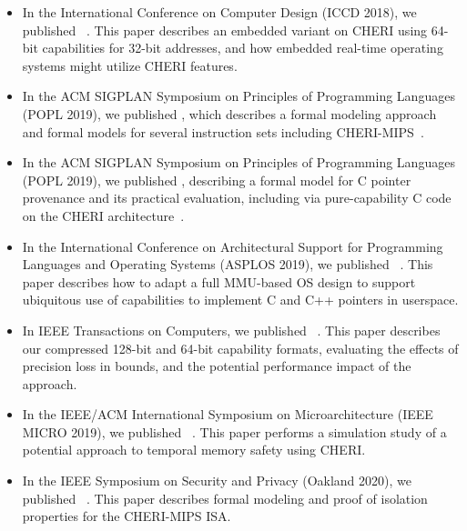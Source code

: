 \begin{itemize}
\item In the International Conference on Computer Design (ICCD 2018), we
  published ~\cite{xia:cherirtos}.
  This paper describes an embedded variant on CHERI using 64-bit capabilities
  for 32-bit addresses, and how embedded real-time operating systems might
  utilize CHERI features.

\item In the ACM SIGPLAN Symposium on Principles of Programming Languages
  (POPL 2019), we published , which describes
  a formal modeling approach and formal models
  for several instruction sets including CHERI-MIPS~\cite{sail-popl2019}.

\item In the ACM SIGPLAN Symposium on Principles of Programming Languages
  (POPL 2019), we published , describing a
  formal model for C pointer provenance and its
  practical evaluation, including via pure-capability C code on the CHERI
  architecture~\cite{cerberus-popl2019}.

\item In the International Conference on Architectural Support for
  Programming Languages and Operating Systems (ASPLOS 2019), we published
  ~\cite{davis2019:cheriabi}.
  This paper describes how to adapt a full MMU-based OS design to support
  ubiquitous use of capabilities to implement C and C++ pointers in userspace.

\item In IEEE Transactions on Computers, we published ~\cite{Woodruff2019}.
  This paper describes our compressed 128-bit and 64-bit capability formats,
  evaluating the effects of precision loss in bounds, and the potential
  performance impact of the approach.

\item In the IEEE/ACM International Symposium on Microarchitecture (IEEE
  MICRO 2019), we published ~\cite{Xia_CHERIvokeCharacterisingPointer_2019}.
  This paper performs a simulation study of a potential approach to temporal
  memory safety using CHERI.

\item In the IEEE Symposium on Security and Privacy (Oakland 2020), we
  published ~\cite{cheri-formal-SP2020}.
  This paper describes formal modeling and proof of isolation properties for
  the CHERI-MIPS ISA.


\end{itemize}
